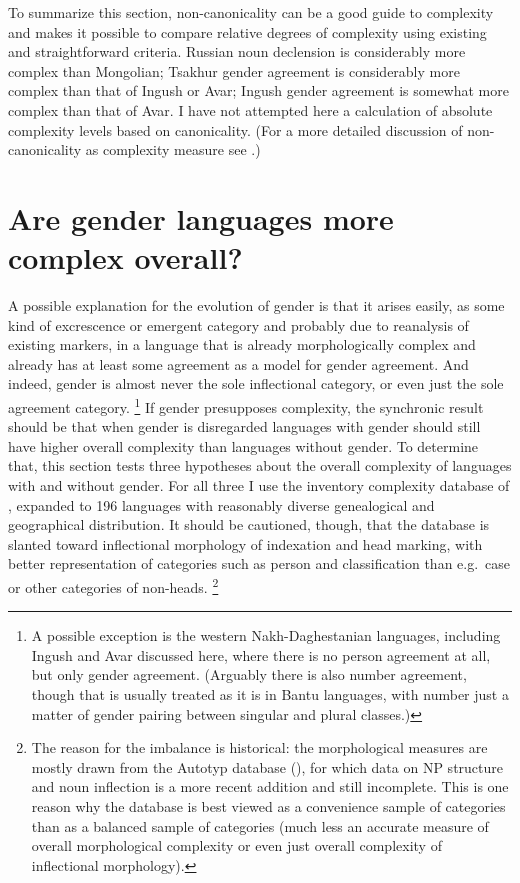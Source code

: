 \documentclass[output=collectionpaper]{langsci/langscibook}
\begin{document}
To summarize this section, non-canonicality can be a good guide to complexity and makes it possible to compare relative degrees of complexity using existing and straightforward criteria. Russian noun declension is considerably more complex than Mongolian; Tsakhur gender agreement is considerably more complex than that of Ingush or Avar; Ingush gender agreement is somewhat more complex than that of Avar. I have not attempted here a calculation of absolute complexity levels based on canonicality. (For a more detailed discussion of non-canonicality as complexity measure see \citealt{Nichols2016,NicholsInpress}.)


\section{Are gender languages more complex overall?}
\label{sec:Nich:3}

A possible explanation for the evolution of gender is that it arises easily, as some kind of excrescence or emergent category and probably due to reanalysis of existing markers, in a language that is already morphologically complex and already has at least some agreement as a model for gender agreement. And indeed, gender is almost never the sole inflectional category, or even just the sole agreement category.%
\footnote{%
\label{fn:Nich:9}
A possible exception is the western Nakh-Daghestanian languages, including Ingush and Avar discussed here, where there is no person agreement at all, but only gender agreement. (Arguably there is also number agreement, though that is usually treated as it is in Bantu languages, with number just a matter of gender pairing between singular and plural classes.)
} %
If gender presupposes complexity, the synchronic result should be that when gender is disregarded languages with gender should still have higher overall complexity than languages without gender. To determine that, this section tests three hypotheses about the overall complexity of languages with and without gender. For all three I use the inventory complexity database of \citet{Nichols2009}, expanded to 196 languages with reasonably diverse genealogical and geographical distribution. It should be cautioned, though, that the database is slanted toward inflectional morphology of indexation and head marking, with better representation of categories such as person and classification than e.g.\ case or other categories of non-heads.%
\footnote{%
The reason for the imbalance is historical: the morphological measures are mostly drawn from the Autotyp database (\citealt{Bickel2017}), for which data on NP structure and noun inflection is a more recent addition and still incomplete. This is one reason why the database is best viewed as a convenience sample of categories than as a balanced sample of categories (much less an accurate measure of overall morphological complexity or even just overall complexity of inflectional morphology).
}%
\end{document}
